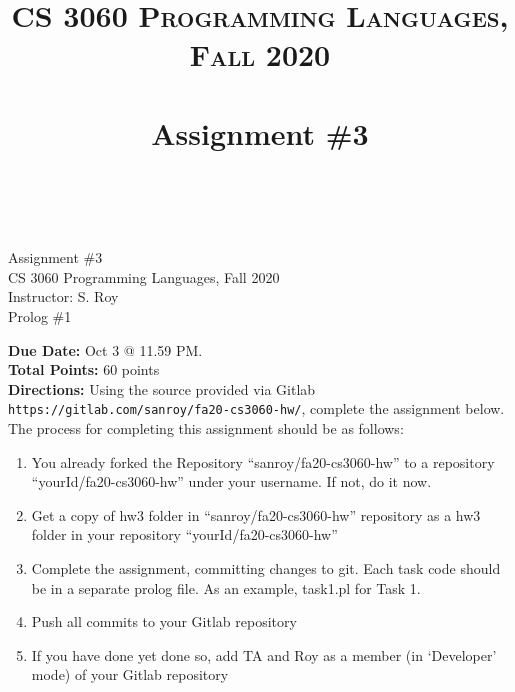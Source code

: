 \documentclass[paper=letter, fontsize=11pt]{scrartcl} %
\title{ 
    \normalfont \normalsize 
    \textsc{CS 3060 Programming Languages, Fall 2020} \\ [25pt] %
    \horrule{0.5pt} \\[0.4cm] %
    \huge Assignment \#3  \\ %
    \horrule{2pt} \\[0.5cm] %
}
\begin{document}
    \begin{center}
         Assignment \#3\\
        \small CS 3060 Programming Languages, Fall 2020 \\
        \small Instructor: S. Roy \\
        \huge Prolog \#1
    \end{center}
    
    \textbf{Due Date:} Oct 3 @ 11.59 PM. \\
    \textbf{Total Points:} 60 points \\

    \textbf{Directions:} Using the source provided via Gitlab \@ \texttt{https://gitlab.com/sanroy/fa20-cs3060-hw/},
complete the assignment below. The process for completing this assignment should be as follows:

    \begin{enumerate}[noitemsep]
        \item You already forked the Repository ``sanroy/fa20-cs3060-hw'' to a repository ``yourId/fa20-cs3060-hw'' under your username. If not, do it now.
        \item Get a copy of hw3 folder in ``sanroy/fa20-cs3060-hw'' repository as a hw3 folder in your repository ``yourId/fa20-cs3060-hw''
        \item Complete the assignment, committing changes to git. Each task code should be in a separate prolog file. As an example, task1.pl for Task 1.
        \item Push all commits to your Gitlab repository
        \item If you have done yet done so, add TA and Roy as a member (in `Developer' mode) of your Gitlab repository
    \end{enumerate}
\end{document}
